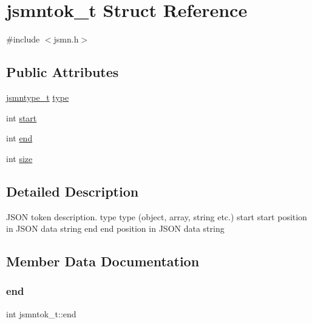 \hypertarget{structjsmntok__t}{}\section{jsmntok\+\_\+t Struct Reference}
\label{structjsmntok__t}


{\ttfamily \#include $<$jsmn.\+h$>$}

\subsection*{Public Attributes}
\begin{DoxyCompactItemize}
\item 
\hyperlink{jsmn_8h_a065320719769f9dc1fbe30094e52802f}{jsmntype\+\_\+t} \hyperlink{structjsmntok__t_ac03dbd6b83cbcd979eb64702d5b9943e}{type}
\item 
int \hyperlink{structjsmntok__t_a0a8f55d0095f268ce8e224fe1234acd0}{start}
\item 
int \hyperlink{structjsmntok__t_ab49e0369f39e9b6174141e7f5bde5996}{end}
\item 
int \hyperlink{structjsmntok__t_a8ac3694b7335456c8e602197778883db}{size}
\end{DoxyCompactItemize}


\subsection{Detailed Description}
J\+S\+ON token description. type type (object, array, string etc.) start start position in J\+S\+ON data string end end position in J\+S\+ON data string 

\subsection{Member Data Documentation}
\mbox{\label{structjsmntok__t_ab49e0369f39e9b6174141e7f5bde5996}} 
\subsubsection{\texorpdfstring{end}{end}}
{\footnotesize\ttfamily int jsmntok\+\_\+t\+::end}

\mbox{\label{structjsmntok__t_a8ac3694b7335456c8e602197778883db}} 
